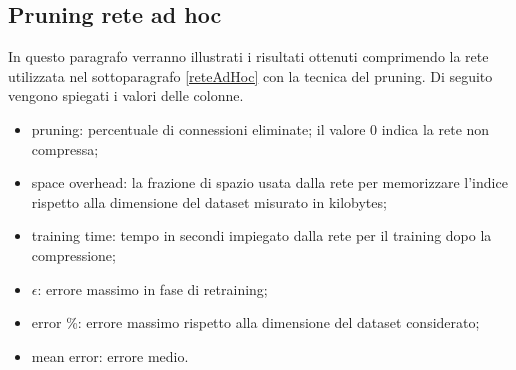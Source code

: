 \documentclass[12pt]{report}
\begin{document}
\subsection{Pruning rete ad hoc}
In questo paragrafo verranno illustrati i risultati ottenuti comprimendo la rete utilizzata nel sottoparagrafo \ref{reteAdHoc} con la tecnica del pruning.
Di seguito vengono spiegati i valori delle colonne.
\begin{itemize}
\item{pruning}: percentuale di connessioni eliminate; il valore 0 indica la rete non compressa;
\item{space overhead}: la frazione di spazio usata dalla rete per memorizzare l'indice rispetto alla dimensione del dataset misurato in kilobytes;
\item{training time}: tempo in secondi impiegato dalla rete per il training dopo la compressione;
\item{$\epsilon$}: errore massimo in fase di retraining;
\item{error \%}: errore massimo rispetto alla dimensione del dataset considerato;
\item{mean error}: errore medio.
\end{itemize}
\par\null\par
\par\null\par



\newpage
\end{document}
